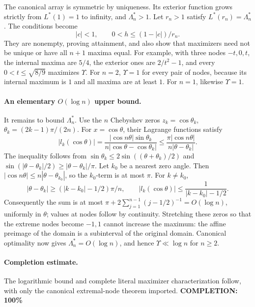 The canonical array is symmetric by uniqueness. Its exterior function grows strictly from \(L^*(1)=1\) to infinity, and \(\Lambda_n^*>1\).
Let \(r_n>1\) satisfy \(L^*(r_n)=\Lambda_n^*\). The conditions become
\[
 |c|<1,\qquad 0<h\leq(1-|c|)/r_n.
\]
They are nonempty, proving attainment, and also show that maximizers need not be unique or have all \(n+1\) maxima equal. For example, with three nodes \(-t,0,t\), the internal maxima are \(5/4\), the exterior ones are \(2/t^2-1\), and every \(0<t\leq\sqrt{8/9}\) maximizes \(\Upsilon\).
For \(n=2\), \(\Upsilon=1\) for every pair of nodes, because its internal maximum is \(1\) and all maxima are at least \(1\). For \(n=1\), likewise \(\Upsilon=1\).

\paragraph{An elementary \(O(\log n)\) upper bound.}
It remains to bound \(\Lambda_n^*\). Use the \(n\) Chebyshev zeros
\(z_k=\cos\theta_k\), \(\theta_k=(2k-1)\pi/(2n)\).
For \(x=\cos\theta\), their Lagrange functions satisfy
\[
 |l_k(\cos\theta)|
 =\frac{|\cos n\theta|\sin\theta_k}
 {n|\cos\theta-\cos\theta_k|}
 \leq\frac{\pi|\cos n\theta|}{n|\theta-\theta_k|}.
\]
The inequality follows from
\(\sin\theta_k\leq2\sin((\theta+\theta_k)/2)\) and
\(\sin(|\theta-\theta_k|/2)\geq|\theta-\theta_k|/\pi\).
Let \(k_0\) be a nearest zero angle. Then
\(|\cos n\theta|\leq n|\theta-\theta_{k_0}|\), so the \(k_0\)-term is at most \(\pi\). For \(k\ne k_0\),
\[
 |\theta-\theta_k|\geq(|k-k_0|-1/2)\pi/n,
 \qquad |l_k(\cos\theta)|\leq\frac1{|k-k_0|-1/2}.
\]
Consequently the sum is at most
\(\pi+2\sum_{j=1}^{n-1}(j-1/2)^{-1}=O(\log n)\), uniformly in \(\theta\); values at nodes follow by continuity.
Stretching these zeros so that the extreme nodes become \(-1,1\) cannot increase the maximum: the affine preimage of the domain is a subinterval of the original domain.
Canonical optimality now gives \(\Lambda_n^*=O(\log n)\), and hence \(\Upsilon\ll\log n\) for \(n\geq2\).

\paragraph{Completion estimate.}
The logarithmic bound and complete literal maximizer characterization follow, with only the canonical extremal-node theorem imported.
\textbf{COMPLETION: 100\%}
